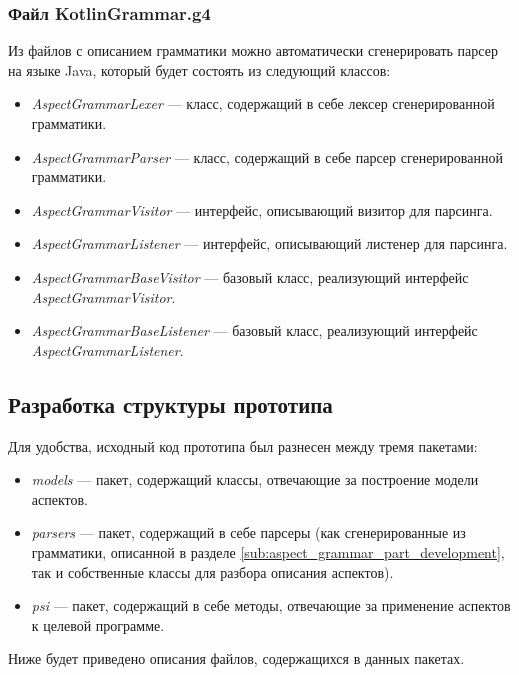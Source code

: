 \subsubsection{Файл KotlinGrammar.g4}
\label{ssub:kotlin_grammar_g4}

Из файлов с описанием грамматики можно автоматически сгенерировать парсер на языке Java, который будет состоять из следующий классов:
\begin{itemize}
	\item \textit{AspectGrammarLexer} --- класс, содержащий в себе лексер
		  сгенерированной грамматики.
	\item \textit{AspectGrammarParser} --- класс, содержащий в себе парсер
		  сгенерированной грамматики.
	\item \textit{AspectGrammarVisitor} --- интерфейс, описывающий визитор для
		  парсинга.
	\item \textit{AspectGrammarListener} --- интерфейс, описывающий листенер
		  для парсинга.
	\item \textit{AspectGrammarBaseVisitor} --- базовый класс, реализующий
		  интерфейс \textit{AspectGrammarVisitor}.
	\item \textit{AspectGrammarBaseListener} --- базовый класс, реализующий
		  интерфейс \textit{AspectGrammarListener}.
\end{itemize}
\subsection{Разработка структуры прототипа}
\label{sub:aspect_weaving_part_development}
Для удобства, исходный код прототипа был разнесен между тремя пакетами:
\begin{itemize}
	\item \textit{models} --- пакет, содержащий классы, отвечающие за построение
		  модели аспектов.
	\item \textit{parsers} --- пакет, содержащий в себе парсеры (как
	сгенерированные из грамматики, описанной в разделе
	\ref{sub:aspect_grammar_part_development}, так и собственные классы для
	разбора описания аспектов).
	\item \textit{psi} --- пакет, содержащий в себе методы, отвечающие за
		  применение аспектов к целевой программе.
\end{itemize}
Ниже будет приведено описания файлов, содержащихся в данных пакетах.
